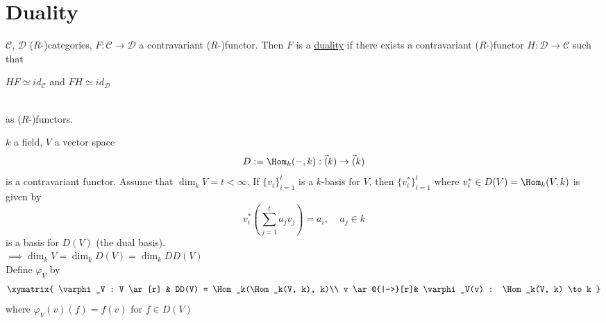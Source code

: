 
\section{Duality}
\begin{defin}
$\mathcal{C}$, $\mathcal{D}$ ($R$-)categories, $F: \mathcal{C} \to \mathcal{D}$ a contravariant ($R$-)functor. Then $F$ is a \underline{duality} if there exists a contravariant ($R$-)functor $H: \mathcal{D} \to \mathcal{C}$ such that \\
\centerline{$HF \simeq id_\mathcal{C}$ and $FH \simeq id_\mathcal{D}$}\\
as ($R$-)functors.
\end{defin}

$k$ a field, $V$ a vector space \[ D:= \Hom_k(-,k): \Vec(k) \to \Vec(k) \] is a contravariant functor. Assume that $\dim_k V = t < \infty$. If $\{ v_i \}^t_{i=1}$ is a $k$-basis for $V$, then $\{ v_i^* \}_{i=1}^t$ where $v_i^* \in D(V) = \Hom_k(V, k)$ is given by \[v_i^*\left(\sum_{j=1}^t a_jv_j\right) = a_i, \;\;\;\; a_j \in k\] is a basis for $D(V)$ (the dual basis).\\
$\implies \dim_k V = \dim_k D(V) = \dim_k DD(V)$\\
Define $\varphi_V$ by 
\[\xymatrix{
\varphi_V : V \ar[r] & DD(V) = \Hom_k(\Hom_k(V, k), k)\\
            v \ar@{|->}[r]& \varphi_V(v) : \Hom_k(V, k) \to k
}\]
where $\varphi_V(v)(f) = f(v)$ for $f \in D(V)$

